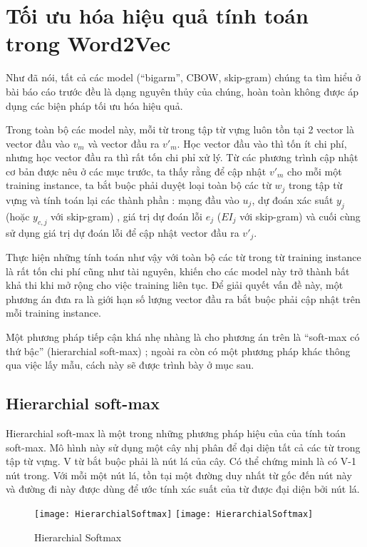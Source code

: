 
\chapter{Tối ưu hóa hiệu quả tính toán trong Word2Vec}
\ifpdf
    \graphicspath{{Chapter1/Chapter1Figs/PNG/}{Chapter1/Chapter1Figs/PDF/}{Chapter1/Chapter1Figs/}}
\else
    \graphicspath{{Chapter1/Chapter1Figs/EPS/}{Chapter1/Chapter1Figs/}}
\fi
Như đã nói, tất cả các model (“bigarm”, CBOW, skip-gram) chúng ta tìm hiểu ở bài báo cáo trước đều là dạng nguyên thủy của chúng, hoàn toàn không được áp dụng các biện pháp tối ưu hóa hiệu quả.

Trong toàn bộ các model này, mỗi từ trong tập từ vựng luôn tồn tại 2 vector là vector đầu vào $v_m$ và vector đầu ra $v'_m$. Học vector đầu  vào thì tốn ít chi phí, nhưng học vector đầu ra thì rất tốn chi phỉ xử lý. Từ các phương trình cập nhật cơ bản được nêu ở các mục trước, ta thấy rằng để cập nhật $v'_m$ cho mỗi một training instance, ta bắt buộc phải duyệt loại toàn bộ các từ $w_j$ trong tập từ vựng và tính toán lại các thành phần : mạng đầu vào $u_j$, dự đoán xác suất $y_j$ (hoặc $y_{c,j}$ với skip-gram) , giá trị dự đoán lỗi $e_j$ ($EI_j$  với skip-gram) và cuối cùng sử dụng giá trị dự đoán lỗi để cập nhật vector đầu ra $v'_j$.

Thực hiện những tính toán như vậy với toàn bộ các từ trong từ training instance là rất tốn chi phí cũng như tài nguyên, khiến cho các model này trở thành bất khả thi khi mở rộng cho việc training liên tục. Để giải quyết vấn đề này, một phương án đưa ra là giới hạn số lượng vector đầu ra bắt buộc phải cập nhật trên mỗi training instance.

Một phương pháp tiếp cận khá nhẹ nhàng là cho phương án trên là “soft-max có thứ bậc”  (hierarchial soft-max) ; ngoài ra còn có một phương pháp khác thông qua việc lấy mẫu, cách này sẽ được trình bày ở mục sau. \\[0.5cm]
\section{Hierarchial soft-max}
Hierarchial soft-max là một trong những phương pháp hiệu của của tính toán soft-max. Mô hình này sử dụng một cây nhị phân để đại diện tất cả các từ trong tập từ vựng.  V từ bắt buộc phải là nút lá của cây. Có thể chứng minh là có V-1 nút trong. Với mỗi một nút lá, tồn tại một đường duy nhất từ gốc đến nút này và đường đi này được dùng để ước tính xác suất của từ được đại diện bởi nút lá.
\begin{figure}[!htbp]
  \begin{center}
    \ifpdf
      \texttt{[image: HierarchialSoftmax]}
    \else
      \texttt{[image: HierarchialSoftmax]}
    \fi
    \caption{Hierarchial Softmax}
    \label{HierarchialSoftmax}
  \end{center}
\end{figure}

